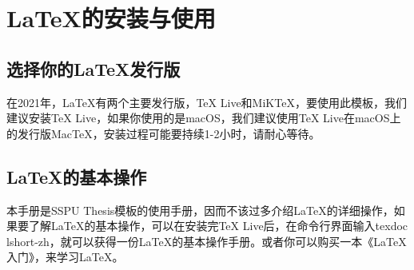 \section{\LaTeX{}的安装与使用}
\subsection{选择你的\LaTeX{}发行版}
在2021年，\LaTeX{}有两个主要发行版，\TeX{} Live和MiK\TeX，要使用此模板，我们建议安装\TeX{} Live，如果你使用的是macOS，我们建议使用\TeX{} Live在macOS上的发行版Mac\TeX{}，安装过程可能要持续1-2小时，请耐心等待。

\subsection{\LaTeX{}的基本操作}
本手册是SSPU Thesis模板的使用手册，因而不该过多介绍\LaTeX{}的详细操作，如果要了解\LaTeX{}的基本操作，可以在安装完\TeX{} Live后，在命令行界面输入{\ttfamily texdoc lshort-zh}，就可以获得一份\LaTeX{}的基本操作手册\cite{lshort}。或者你可以购买一本《\LaTeX{}入门》\cite{刘-LaTeX}，来学习\LaTeX{}。

\newpage
